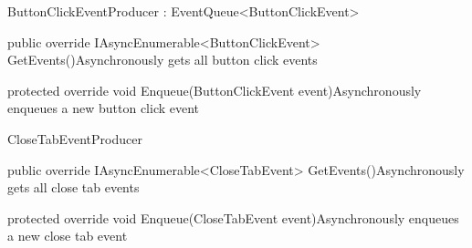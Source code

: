 \begin{class}{ButtonClickEventProducer : EventQueue<ButtonClickEvent>} 
    


    \begin{methods}
        \begin{method}{public override IAsyncEnumerable<ButtonClickEvent> GetEvents()}{Asynchronously gets all button click events}
        \end{method}
        \begin{method}{protected override void Enqueue(ButtonClickEvent event)}{Asynchronously enqueues a new button click event}
            \begin{parameters}
            \end{parameters}
        \end{method}
    \end{methods}
\end{class}

\begin{class}{CloseTabEventProducer} 
    


    \begin{methods}
        \begin{method}{public override IAsyncEnumerable<CloseTabEvent> GetEvents()}{Asynchronously gets all close tab events}
        \end{method}
        \begin{method}{protected override void Enqueue(CloseTabEvent event)}{Asynchronously enqueues a new close tab event}
            \begin{parameters}
            \end{parameters}
        \end{method}
    \end{methods}
\end{class}

